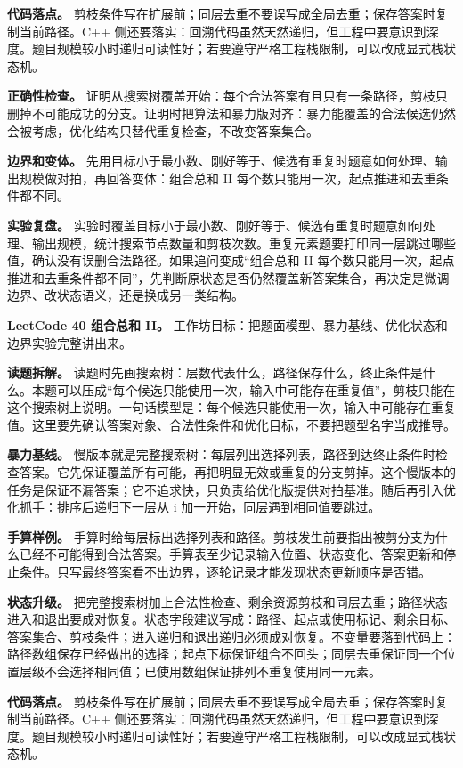 \textbf{代码落点。} 剪枝条件写在扩展前；同层去重不要误写成全局去重；保存答案时复制当前路径。C++ 侧还要落实：回溯代码虽然天然递归，但工程中要意识到深度。题目规模较小时递归可读性好；若要遵守严格工程栈限制，可以改成显式栈状态机。

\textbf{正确性检查。} 证明从搜索树覆盖开始：每个合法答案有且只有一条路径，剪枝只删掉不可能成功的分支。证明时把算法和暴力版对齐：暴力能覆盖的合法候选仍然会被考虑，优化结构只替代重复检查，不改变答案集合。

\textbf{边界和变体。} 先用目标小于最小数、刚好等于、候选有重复时题意如何处理、输出规模做对拍，再回答变体：组合总和 II 每个数只能用一次，起点推进和去重条件都不同。

\textbf{实验复盘。} 实验时覆盖目标小于最小数、刚好等于、候选有重复时题意如何处理、输出规模，统计搜索节点数量和剪枝次数。重复元素题要打印同一层跳过哪些值，确认没有误删合法路径。如果追问变成“组合总和 II 每个数只能用一次，起点推进和去重条件都不同”，先判断原状态是否仍然覆盖新答案集合，再决定是微调边界、改状态语义，还是换成另一类结构。

\noindent\textbf{LeetCode 40 组合总和 II。} 工作坊目标：把题面模型、暴力基线、优化状态和边界实验完整讲出来。

\textbf{读题拆解。} 读题时先画搜索树：层数代表什么，路径保存什么，终止条件是什么。本题可以压成“每个候选只能使用一次，输入中可能存在重复值”，剪枝只能在这个搜索树上说明。一句话模型是：每个候选只能使用一次，输入中可能存在重复值。这里要先确认答案对象、合法性条件和优化目标，不要把题型名字当成推导。

\textbf{暴力基线。} 慢版本就是完整搜索树：每层列出选择列表，路径到达终止条件时检查答案。它先保证覆盖所有可能，再把明显无效或重复的分支剪掉。这个慢版本的任务是保证不漏答案；它不追求快，只负责给优化版提供对拍基准。随后再引入优化抓手：排序后递归下一层从 i 加一开始，同层遇到相同值要跳过。

\textbf{手算样例。} 手算时给每层标出选择列表和路径。剪枝发生前要指出被剪分支为什么已经不可能得到合法答案。手算表至少记录输入位置、状态变化、答案更新和停止条件。只写最终答案看不出边界，逐轮记录才能发现状态更新顺序是否错。

\textbf{状态升级。} 把完整搜索树加上合法性检查、剩余资源剪枝和同层去重；路径状态进入和退出要成对恢复。状态字段建议写成：路径、起点或使用标记、剩余目标、答案集合、剪枝条件；进入递归和退出递归必须成对恢复。不变量要落到代码上：路径数组保存已经做出的选择；起点下标保证组合不回头；同层去重保证同一个位置层级不会选择相同值；已使用数组保证排列不重复使用同一元素。

\textbf{代码落点。} 剪枝条件写在扩展前；同层去重不要误写成全局去重；保存答案时复制当前路径。C++ 侧还要落实：回溯代码虽然天然递归，但工程中要意识到深度。题目规模较小时递归可读性好；若要遵守严格工程栈限制，可以改成显式栈状态机。

